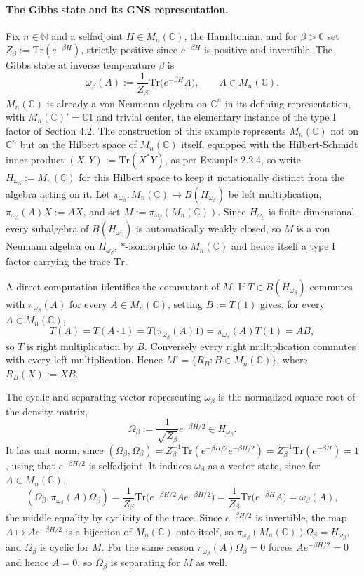 \paragraph{The Gibbs state and its GNS representation.}
Fix $n \in \mathbb{N}$ and a selfadjoint $H \in M_n(\mathbb{C})$, the Hamiltonian, and for $\beta > 0$ set $Z_\beta := \mathrm{Tr}(e^{-\beta H})$, strictly positive since $e^{-\beta H}$ is positive and invertible. The Gibbs state at inverse temperature $\beta$ is
\[
\omega_\beta(A) := \frac{1}{Z_\beta}\mathrm{Tr}\big(e^{-\beta H}A\big), \qquad A \in M_n(\mathbb{C}).
\]
$M_n(\mathbb{C})$ is already a von Neumann algebra on $\mathbb{C}^n$ in its defining representation, with $M_n(\mathbb{C})' = \mathbb{C}1$ and trivial center, the elementary instance of the type I factor of Section 4.2. The construction of this example represents $M_n(\mathbb{C})$ not on $\mathbb{C}^n$ but on the Hilbert space of $M_n(\mathbb{C})$ itself, equipped with the Hilbert-Schmidt inner product $(X,Y) := \mathrm{Tr}(X^*Y)$, as per Example 2.2.4, so write $H_{\omega_\beta} := M_n(\mathbb{C})$ for this Hilbert space to keep it notationally distinct from the algebra acting on it. Let $\pi_{\omega_\beta} : M_n(\mathbb{C}) \to B(H_{\omega_\beta})$ be left multiplication, $\pi_{\omega_\beta}(A)X := AX$, and set $M := \pi_{\omega_\beta}(M_n(\mathbb{C}))$. Since $H_{\omega_\beta}$ is finite-dimensional, every subalgebra of $B(H_{\omega_\beta})$ is automatically weakly closed, so $M$ is a von Neumann algebra on $H_{\omega_\beta}$, $*$-isomorphic to $M_n(\mathbb{C})$ and hence itself a type I factor carrying the trace $\mathrm{Tr}$.

A direct computation identifies the commutant of $M$. If $T \in B(H_{\omega_\beta})$ commutes with $\pi_{\omega_\beta}(A)$ for every $A \in M_n(\mathbb{C})$, setting $B := T(1)$ gives, for every $A \in M_n(\mathbb{C})$,
\[
T(A) = T(A \cdot 1) = T\big(\pi_{\omega_\beta}(A)1\big) = \pi_{\omega_\beta}(A)T(1) = AB,
\]
so $T$ is right multiplication by $B$. Conversely every right multiplication commutes with every left multiplication. Hence $M' = \{R_B : B \in M_n(\mathbb{C})\}$, where $R_B(X) := XB$.

The cyclic and separating vector representing $\omega_\beta$ is the normalized square root of the density matrix,
\[
\Omega_\beta := \frac{1}{\sqrt{Z_\beta}}e^{-\beta H/2} \in H_{\omega_\beta}.
\]
It has unit norm, since $(\Omega_\beta,\Omega_\beta) = Z_\beta^{-1}\mathrm{Tr}(e^{-\beta H/2}e^{-\beta H/2}) = Z_\beta^{-1}\mathrm{Tr}(e^{-\beta H}) = 1$, using that $e^{-\beta H/2}$ is selfadjoint. It induces $\omega_\beta$ as a vector state, since for $A \in M_n(\mathbb{C})$,
\[
(\Omega_\beta,\pi_{\omega_\beta}(A)\Omega_\beta) = \frac{1}{Z_\beta}\mathrm{Tr}\big(e^{-\beta H/2}Ae^{-\beta H/2}\big) = \frac{1}{Z_\beta}\mathrm{Tr}\big(e^{-\beta H}A\big) = \omega_\beta(A),
\]
the middle equality by cyclicity of the trace. Since $e^{-\beta H/2}$ is invertible, the map $A \mapsto Ae^{-\beta H/2}$ is a bijection of $M_n(\mathbb{C})$ onto itself, so $\pi_{\omega_\beta}(M_n(\mathbb{C}))\Omega_\beta = H_{\omega_\beta}$, and $\Omega_\beta$ is cyclic for $M$. For the same reason $\pi_{\omega_\beta}(A)\Omega_\beta = 0$ forces $Ae^{-\beta H/2}=0$ and hence $A=0$, so $\Omega_\beta$ is separating for $M$ as well.

